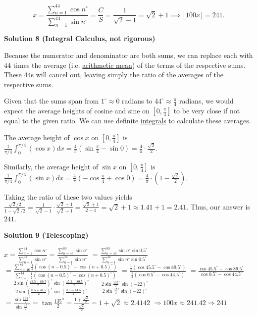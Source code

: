 \begin{enumerate}
 
 \[x=\frac{\sum\limits_{n=1}^{44} \cos n^\circ}{\sum\limits_{n=1}^{44} \sin n^\circ} = \dfrac{C}{S} = \dfrac{1}{\sqrt{2}-1} = \sqrt{2} +1 \implies \lfloor{100x\rfloor} = \boxed{241}.\]




\textbf{Solution 8 (Integral Calculus, not rigorous)}

Because the numerator and denominator are both sums, we can replace each with $44$ times the average (i.e. \href{https://artofproblemsolving.com/wiki/index.php?title=Arithmetic\_mean}{arithmetic mean}) of the terms of the respective sums. These $44$s will cancel out, leaving simply the ratio of the averages of the respective sums.

 Given that the sums span from $1^{\circ}\approx 0$ radians to $44^{\circ}\approx \frac\pi4$ radians, we would expect the average heights of cosine and sine on $[0,\frac\pi4]$ to be very close if not equal to the given ratio. We can use definite \href{https://artofproblemsolving.com/wiki/index.php?title=Integrals}{integrals} to calculate these averages.

 The average height of $\cos x$ on $[0,\frac\pi4]$ is $\frac1{\pi/4}\int^{\pi/4}_0(\cos x) dx = \frac4\pi(\sin\frac\pi4-\sin0) = \frac4\pi\cdot\frac{\sqrt2}2$.

 Similarly, the average height of $\sin x$ on $[0,\frac\pi4]$ is $\frac1{\pi/4}\int^{\pi/4}_0(\sin x) dx = \frac4\pi(-\cos\frac\pi4+\cos0) = \frac4\pi\cdot(1-\frac{\sqrt2}2)$.

 Taking the ratio of these two values yields $\frac{\sqrt2/2}{1-\sqrt2/2}=\frac1{\sqrt2-1}\cdot\frac{\sqrt2+1}{\sqrt2+1}=\frac{\sqrt2+1}{2-1}=\sqrt2+1 \approx 1.41+1 = 2.41$. Thus, our answer is $\boxed{241}$.

 



\textbf{Solution 9 (Telescoping)}

$x=\frac{\sum\limits_{n=1}^{44} \cos n^\circ}{\sum\limits_{n=1}^{44} \sin n^\circ}=\frac{\sum\limits_{n=46}^{89} \sin n^\circ}{\sum\limits_{n=1}^{44} \sin n^\circ}$
$=\frac{\sum\limits_{n=46}^{89} \sin n^\circ\sin0.5^\circ}{\sum\limits_{n=1}^{44} \sin n^\circ\sin0.5^\circ}$
$=\frac{\sum\limits_{n=46}^{89}\frac{1}{2}\left(\cos(n-0.5)^\circ-\cos(n+0.5)^\circ\right)}{\sum\limits_{n=1}^{44}\frac{1}{2}\left(\cos(n-0.5)^\circ-\cos(n+0.5)^\circ\right)}$
$=\frac{\frac{1}{2}(\cos45.5^\circ-\cos89.5^\circ)}{\frac{1}{2}(\cos0.5^\circ-\cos44.5^\circ)}$
$=\frac{\cos45.5^\circ-\cos89.5^\circ}{\cos0.5^\circ-\cos44.5^\circ}$
$=\frac{2\sin\left(\frac{45.5+89.5}{2}\right)^\circ\sin\left(\frac{45.5-89.5}{2}\right)^\circ}{2\sin\left(\frac{0.5+44.5}{2}\right)^\circ\sin\left(\frac{0.5-44.5}{2}\right)^\circ}$
$=\frac{2\sin\frac{135}{2}^\circ\sin(-22)^\circ}{2\sin\frac{45}{2}^\circ\sin(-22)^\circ}$
$=\frac{\sin\frac{135}{2}^\circ}{\sin\frac{45}{2}^\circ}=\tan\frac{135}{2}^\circ=\frac{1+\frac{\sqrt{2}}{2}}{\frac{\sqrt{2}}{2}}=1+\sqrt{2}\approx 2.4142$
$\Rightarrow 100x\approx 241.42\Rightarrow\boxed{241}$




\end{enumerate}
